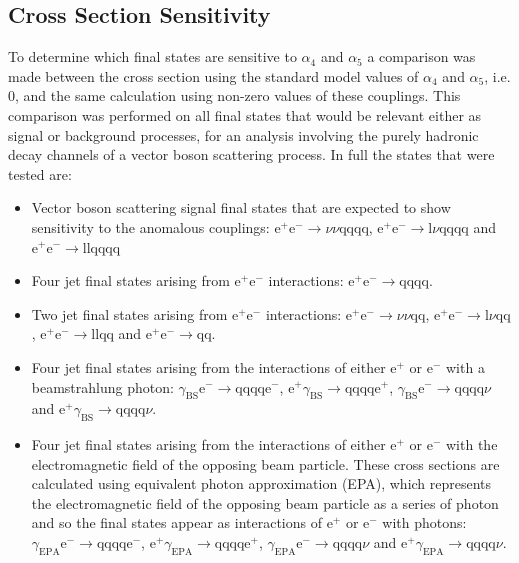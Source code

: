 \subsection{Cross Section Sensitivity}
\label{sec:crosssectioncheck}
To determine which final states are sensitive to $\alpha_{4}$ and $\alpha_{5}$ a comparison was made between the cross section using the standard model values of $\alpha_{4}$ and $\alpha_{5}$, i.e. 0, and the same calculation using non-zero values of these couplings.  This comparison was performed on all final states that would be relevant either as signal or background processes, for an analysis involving the purely hadronic decay channels of a vector boson scattering process.  In full the states that were tested are:

\begin{itemize}
\item Vector boson scattering signal final states that are expected to show sensitivity to the anomalous couplings: $\text{e}^{+}\text{e}^{-} \rightarrow \nu\nu\text{qqqq}$, $\text{e}^{+}\text{e}^{-} \rightarrow \text{l}\nu\text{qqqq}$ and $\text{e}^{+}\text{e}^{-} \rightarrow \text{llqqqq}$
\item Four jet final states arising from $\text{e}^{+}\text{e}^{-}$ interactions: $\text{e}^{+}\text{e}^{-} \rightarrow \text{qqqq}$.
\item Two jet final states arising from $\text{e}^{+}\text{e}^{-}$ interactions: $\text{e}^{+}\text{e}^{-} \rightarrow \nu{\nu}\text{qq}$, $\text{e}^{+}\text{e}^{-} \rightarrow \text{l}\nu\text{qq}$, $\text{e}^{+}\text{e}^{-} \rightarrow \text{llqq}$ and $\text{e}^{+}\text{e}^{-} \rightarrow \text{qq}$.
\item Four jet final states arising from the interactions of either $\text{e}^{+}$ or $\text{e}^{-}$ with a beamstrahlung photon: $\gamma_{\text{BS}}\text{e}^{-} \rightarrow \text{qqqq}\text{e}^{-}$, $\text{e}^{+}\gamma_{\text{BS}} \rightarrow \text{qqqq}\text{e}^{+}$, $\gamma_{\text{BS}}\text{e}^{-} \rightarrow \text{qqqq}\nu$ and $\text{e}^{+}\gamma_{\text{BS}} \rightarrow \text{qqqq}\nu$.
\item Four jet final states arising from the interactions of either $\text{e}^{+}$ or $\text{e}^{-}$ with the electromagnetic field of the opposing beam particle.  These cross sections are calculated using equivalent photon approximation (EPA), which represents the electromagnetic field of the opposing beam particle as a series of photon and so the final states appear as interactions of $\text{e}^{+}$ or $\text{e}^{-}$ with photons: $\gamma_{\text{EPA}}\text{e}^{-} \rightarrow \text{qqqq}\text{e}^{-}$, $\text{e}^{+}\gamma_{\text{EPA}} \rightarrow \text{qqqq}\text{e}^{+}$, $\gamma_{\text{EPA}}\text{e}^{-} \rightarrow \text{qqqq}\nu$ and $\text{e}^{+}\gamma_{\text{EPA}} \rightarrow \text{qqqq}\nu$.

\end{itemize}
